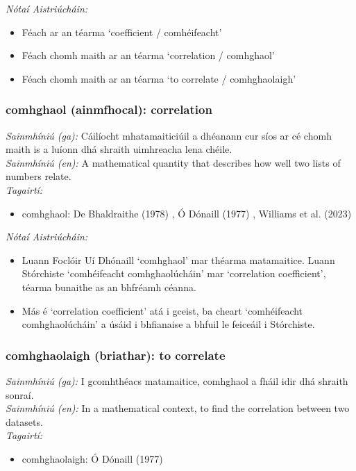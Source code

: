  \noindent \textit{Nótaí Aistriúcháin:}
\begin{itemize}
	\item Féach ar an téarma `coefficient / comhéifeacht'
	\item Féach chomh maith ar an téarma `correlation / comhghaol'
	\item Féach chomh maith ar an téarma `to correlate / comhghaolaigh'
\end{itemize}


\subsubsection*{comhghaol (ainmfhocal): correlation}
 \noindent \textit{Sainmhíniú (ga):} Cáilíocht mhatamaiticiúil a dhéanann cur síos ar cé chomh maith is a luíonn dhá shraith uimhreacha lena chéile.
\\
 \noindent \textit{Sainmhíniú (en):} A mathematical quantity that describes how well two lists of numbers relate.
\\
 \noindent \textit{Tagairtí:}
\begin{itemize}
	\item comhghaol: De Bhaldraithe (1978) \cite{de-bhaldraithe}, Ó Dónaill (1977) \cite{odonaill}, Williams et al. (2023) \cite{storchiste}
\end{itemize}

 \noindent \textit{Nótaí Aistriúcháin:}
\begin{itemize}
	\item Luann Foclóir Uí Dhónaill `comhghaol' mar théarma matamaitice. Luann Stórchiste `comhéifeacht comhghaolúcháin' mar `correlation coefficient', téarma bunaithe as an bhfréamh céanna.
	\item Más é `correlation coefficient' atá i gceist, ba cheart `comhéifeacht comhghaolúcháin' a úsáid i bhfianaise a bhfuil le feiceáil i Stórchiste.
\end{itemize}


\subsubsection*{comhghaolaigh (briathar): to correlate}
 \noindent \textit{Sainmhíniú (ga):} I gcomhthéacs matamaitice, comhghaol a fháil idir dhá shraith sonraí.
\\
 \noindent \textit{Sainmhíniú (en):} In a mathematical context, to find the correlation between two datasets.
\\
 \noindent \textit{Tagairtí:}
\begin{itemize}
	\item comhghaolaigh: Ó Dónaill (1977) \cite{odonaill}
\end{itemize}

